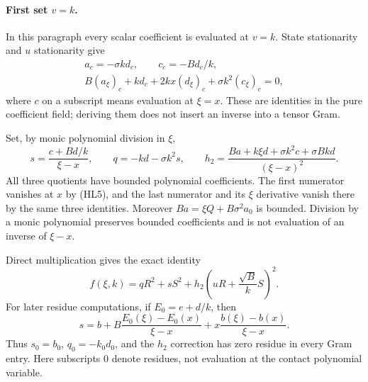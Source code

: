 \paragraph{First set $v=k$.}
In this paragraph every scalar coefficient is evaluated at $v=k$.
State stationarity and $u$ stationarity give
\begin{gather*}
 a_c=-\sigma k d_c,\qquad c_c=-B d_c/k,\\
 B(a_\xi)_c+kd_c+2kx(d_\xi)_c
                      +\sigma k^2(c_\xi)_c=0,     \tag{HL5}
\end{gather*}
where $c$ on a subscript means evaluation at $\xi=x$.
These are identities in the pure coefficient field; deriving them
does not insert an inverse into a tensor Gram.

Set, by monic polynomial division in $\xi$,
\[
 s=\frac{c+Bd/k}{\xi-x},\qquad
 q=-kd-\sigma k^2s,\qquad
 h_2=\frac{Ba+k\xi d+\sigma k^2c+\sigma Bkd}
                    {(\xi-x)^2}.                 \tag{HL6}
\]
All three quotients have bounded polynomial coefficients.  The first
numerator vanishes at $x$ by (HL5), and the last numerator and its
$\xi$ derivative vanish there by the same three identities.
Moreover $Ba=\xi Q+B\sigma^2a_0$ is bounded.  Division by a monic
polynomial preserves bounded coefficients and is not evaluation of
an inverse of $\xi-x$.

Direct multiplication gives the exact identity
\[
 f(\xi,k)=qR^2+sS^2
                  +h_2\left(uR+\frac{\sqrt B}{k}S\right)^2.
                                                               \tag{HL7}
\]
For later residue computations, if $E_0=e+d/k$, then
\[
 s=b+B\frac{E_0(\xi)-E_0(x)}{\xi-x}
       +x\frac{b(\xi)-b(x)}{\xi-x}.                \tag{HL8}
\]
Thus $s_0=b_0$, $q_0=-k_0d_0$, and the $h_2$ correction has zero
residue in every Gram entry.  Here subscripts $0$ denote residues,
not evaluation at the contact polynomial variable.

